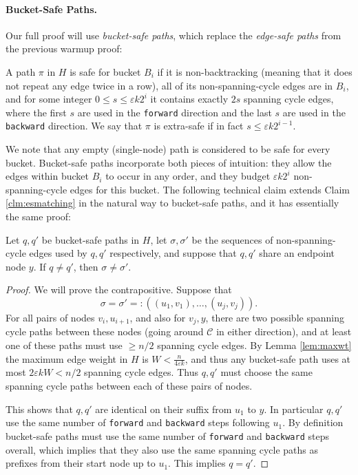 \documentclass{theoretics}
\newcommand{\eps}{\varepsilon}
\newcommand{\cee}{\mathcal{C}}
\newcommand{\forward}{\texttt{forward}}
\newcommand{\backward}{\texttt{backward}}
\begin{document}
\paragraph{Bucket-Safe Paths.}

Our full proof will use \emph{bucket-safe paths}, which replace the \emph{edge-safe paths} from the previous warmup proof:

\begin{definition} 
A path $\pi$ in $H$ is safe for bucket $B_i$ if it is non-backtracking (meaning that it does not repeat any edge twice in a row), all of its non-spanning-cycle edges are in $B_i$, and for some integer $0 \le s \le \eps k 2^i$ it contains exactly $2s$ spanning cycle edges, where the first $s$ are used in the \forward{} direction and the last $s$ are used in the \backward{} direction.
We say that $\pi$ is extra-safe if in fact $s \le \eps k 2^{i-1}$.
\end{definition}

We note that any empty (single-node) path is considered to be safe for every bucket.
Bucket-safe paths incorporate both pieces of intuition: they allow the edges within bucket $B_i$ to occur in any order, and they budget $\eps k 2^i$ non-spanning-cycle edges for this bucket.
The following technical claim extends Claim \ref{clm:esmatching} in the natural way to bucket-safe paths, and it has essentially the same proof:
\begin{claim} \label{clm:bsmatching}
Let $q, q'$ be bucket-safe paths in $H$, let $\sigma, \sigma'$ be the sequences of non-spanning-cycle edges used by $q, q'$ respectively, and suppose that $q, q'$ share an endpoint node $y$.
If $q \ne q'$, then $\sigma \ne \sigma'$.
\end{claim}
\begin{proof}
We will prove the contrapositive.
Suppose that
$$\sigma = \sigma' =: \left((u_1, v_1), \dots, (u_j, v_j)\right).$$
For all pairs of nodes $v_i, u_{i+1}$, and also for $v_j, y$, there are two possible spanning cycle paths between these nodes (going around $\cee$ in either direction), and at least one of these paths must use $\ge n/2$ spanning cycle edges.
By Lemma \ref{lem:maxwt} the maximum edge weight in $H$ is $W < \frac{n}{4 \eps k}$, and thus any bucket-safe path uses at most $2 \eps k W < n/2$ spanning cycle edges.
Thus $q, q'$ must choose the same spanning cycle paths between each of these pairs of nodes.

This shows that $q, q'$ are identical on their suffix from $u_1$ to $y$.
In particular $q, q'$ use the same number of \forward{} and \backward{} steps following $u_1$.
By definition bucket-safe paths must use the same number of \forward{} and \backward{} steps overall, which implies that they also use the same spanning cycle paths as prefixes from their start node up to $u_1$. This implies $q=q'$.
\end{proof}
\end{document}
